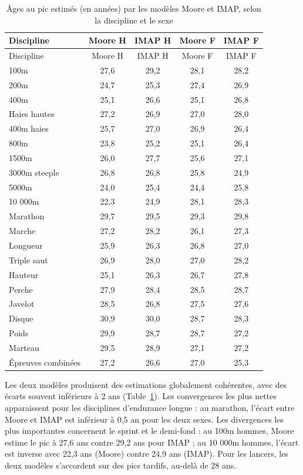 \documentclass[
  french,
  11pt,
  a4paper,
]{article}
\begin{document}
\begin{longtable}[]{@{}lcccc@{}}
\caption{Âges au pic estimés (en années) par les modèles Moore et IMAP,
selon la discipline et le sexe}\label{tbl-comparatif-pic}\tabularnewline
\toprule\noalign{}
Discipline & Moore H & IMAP H & Moore F & IMAP F \\
\midrule\noalign{}
\endfirsthead
\toprule\noalign{}
Discipline & Moore H & IMAP H & Moore F & IMAP F \\
\midrule\noalign{}
\endhead
\bottomrule\noalign{}
\endlastfoot
100m & 27,6 & 29,2 & 28,1 & 28,2 \\
200m & 24,7 & 25,3 & 27,4 & 26,9 \\
400m & 25,1 & 26,6 & 25,1 & 26,8 \\
Haies hautes & 27,2 & 26,9 & 27,0 & 28,0 \\
400m haies & 25,7 & 27,0 & 26,9 & 26,4 \\
800m & 23,8 & 25,2 & 25,1 & 26,4 \\
1500m & 26,0 & 27,7 & 25,6 & 27,1 \\
3000m steeple & 26,8 & 26,8 & 25,8 & 24,9 \\
5000m & 24,0 & 25,4 & 24,4 & 25,8 \\
10 000m & 22,3 & 24,9 & 28,1 & 28,3 \\
Marathon & 29,7 & 29,5 & 29,3 & 29,8 \\
Marche & 27,2 & 28,2 & 26,1 & 27,3 \\
Longueur & 25,9 & 26,3 & 26,8 & 27,0 \\
Triple saut & 26,9 & 28,0 & 27,0 & 28,2 \\
Hauteur & 25,1 & 26,3 & 26,7 & 27,8 \\
Perche & 27,9 & 28,4 & 28,5 & 28,7 \\
Javelot & 28,5 & 26,8 & 27,5 & 27,6 \\
Disque & 30,9 & 30,0 & 28,7 & 28,3 \\
Poids & 29,9 & 28,7 & 28,7 & 27,2 \\
Marteau & 29,5 & 28,9 & 27,1 & 27,2 \\
Épreuves combinées & 27,2 & 26,6 & 27,0 & 25,3 \\
\end{longtable}

Les deux modèles produisent des estimations globalement cohérentes, avec
des écarts souvent inférieurs à 2 ans (Table~\ref{tbl-comparatif-pic}).
Les convergences les plus nettes apparaissent pour les disciplines
d'endurance longue : au marathon, l'écart entre Moore et IMAP est
inférieur à 0,5 an pour les deux sexes. Les divergences les plus
importantes concernent le sprint et le demi-fond : au 100m hommes, Moore
estime le pic à 27,6 ans contre 29,2 ans pour IMAP ; au 10 000m hommes,
l'écart est inverse avec 22,3 ans (Moore) contre 24,9 ans (IMAP). Pour
les lancers, les deux modèles s'accordent sur des pics tardifs, au-delà
de 28 ans.
\end{document}
